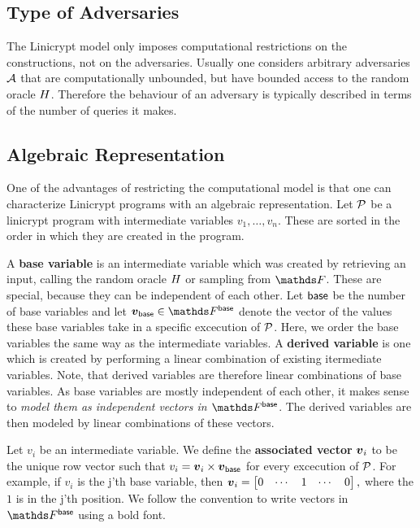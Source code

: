 \subsection{Type of Adversaries}
The Linicrypt model only imposes computational restrictions on the constructions,
not on the adversaries.
Usually one considers arbitrary adversaries $\A$ that are computationally unbounded,
but have bounded access to the random oracle $\H$.
Therefore the behaviour of an adversary is typically described in terms of the number of queries it makes.

\subsection{Algebraic Representation}

One of the advantages of restricting the computational model is that one can characterize
Linicrypt programs with an algebraic representation.
Let $\P$ be a linicrypt program with intermediate variables $v_1, \dots, v_n$.
These are sorted in the order in which they are created in the program.

A \textbf{base variable} is an intermediate variable which was created by retrieving an input,
calling the random oracle $\H$ or sampling from $\F$.
These are special, because they can be independent of each other.
Let $\base$ be the number of base variables
and let $\vbase \in \Base$ denote the vector of the values these base variables take
in a specific excecution of $\P$.
Here, we order the base variables the same way as the intermediate variables.
A \textbf{derived variable} is one which is created by performing a linear combination of existing itermediate variables.
Note, that derived variables are therefore linear combinations of base variables.
As base variables are mostly independent of each other,
it makes sense to \emph {model them as independent vectors in $\Base$}.
The derived variables are then modeled by linear combinations of these vectors.

Let $v_i$ be an intermediate variable.
We define the \textbf{associated vector} $\v v_i$ to be the unique row vector such that
$v_i = \v v_i \times \vbase$ for every excecution of $\P$.
For example, if $v_i$ is the j'th base variable, then 
$
  \v v_i = \begin{bmatrix}
  0 & \cdots & 1 & \cdots & 0
  \end{bmatrix},
$
where the $1$ is in the j'th position.
We follow the convention to write vectors in $\Base$ using a bold font.

